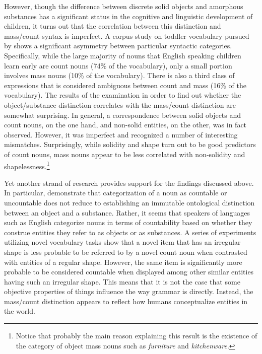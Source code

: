 However, though the difference between discrete solid objects and amorphous substances has a significant status in the cognitive and linguistic development of children, it turns out that the correlation between this distinction and mass/count syntax is imperfect. A corpus study on toddler vocabulary pursued by \citet{samuelson_smith1999early} shows a significant asymmetry between particular syntactic categories. Specifically, while the large majority of nouns that English speaking children learn early are count nouns (74\% of the vocabulary), only a small portion involves mass nouns (10\% of the vocabulary). There is also a third class of expressions that is considered ambiguous between count and mass (16\% of the vocabulary). The results of the examination in order to find out whether the object/substance distinction correlates with the mass/count distinction are somewhat surprising. In general, a correspondence between solid objects and count nouns, on the one hand, and non-solid entities, on the other, was in fact observed. However, it was imperfect and \citeauthor{samuelson_smith1999early} recognized a number of interesting mismatches. Surprisingly, while solidity and shape turn out to be good predictors of count nouns, mass nouns appear to be less correlated with non-solidity and shapelessness.\footnote{Notice that probably the main reason explaining this result is the existence of the category of object mass nouns such as \textit{furniture} and \textit{kitchenware}.}

Yet another strand of research provides support for the findings discussed above. In particular, \citet{prasada_ferenz_haskell2002conceiving} demonstrate that categorization of a noun as countable or uncountable does not reduce to establishing an immutable ontological distinction between an object and a substance. Rather, it seems that speakers of languages such as English categorize nouns in terms of countability based on whether they construe entities they refer to as objects or as substances. A series of experiments utilizing novel vocabulary tasks show that a novel item that has an irregular shape is less probable to be referred to by a novel count noun when contrasted with entities of a regular shape. However, the same item is significantly more probable to be considered countable when displayed among other similar entities having such an irregular shape. This means that it is not the case that some objective properties of things influence the way grammar is directly. Instead, the mass/count distinction appears to reflect how humans conceptualize entities in the world.

